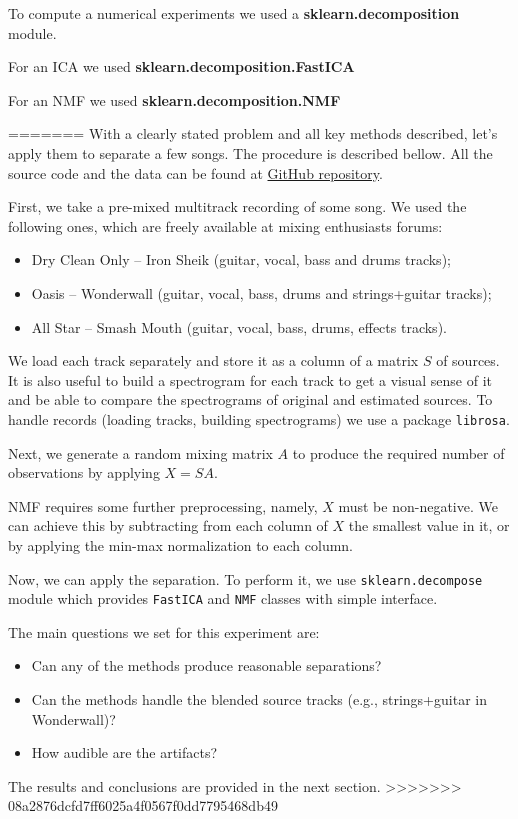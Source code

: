 \documentclass[../main.tex]{subfiles} %
\begin{document}
To compute a numerical experiments we used a \textbf{sklearn.decomposition} module.


For an ICA we used \textbf{sklearn.decomposition.FastICA}

For an NMF we used \textbf{sklearn.decomposition.NMF}








=======
With a clearly stated problem and all key methods described, let's apply them to separate a few songs. The procedure is described bellow. All the source code and the data can be found at \href{https://github.com/ikachko/LA-FinalProject}{GitHub repository}.

First, we take a pre-mixed multitrack recording of some song. We used the following ones, which are freely available at mixing enthusiasts forums:

\begin{itemize}[leftmargin=4em]
	\item Dry Clean Only -- Iron Sheik (guitar, vocal, bass and drums tracks);
	\item Oasis -- Wonderwall (guitar, vocal, bass, drums and strings+guitar tracks);
	\item All Star -- Smash Mouth (guitar, vocal, bass, drums, effects tracks).
\end{itemize}

We load each track separately and store it as a column of a matrix $S$ of sources.
It is also useful to build a spectrogram for each track to get a visual sense of it and be able to compare the spectrograms of original and estimated sources. 
To handle records (loading tracks, building spectrograms) we use a package \lstinline{librosa}.

Next, we generate a random mixing matrix $A$ to produce the required number of observations by applying $X = S A$.

NMF requires some further preprocessing, namely, $X$ must be non-negative.
We can achieve this by subtracting from each column of $X$ the smallest value in it, or by applying the min-max normalization to each column. 

Now, we can apply the separation. 
To perform it, we use \lstinline{sklearn.decompose} module which provides \lstinline{FastICA} and \lstinline{NMF} classes with simple interface.

The main questions we set for this experiment are:

\begin{itemize}[leftmargin=4em]
	\item Can any of the methods produce reasonable separations?
	\item Can the methods handle the blended source tracks (e.g., strings+guitar in Wonderwall)?
	\item How audible are the artifacts?
\end{itemize}

The results and conclusions are provided in the next section.
>>>>>>> 08a2876dcfd7ff6025a4f0567f0dd7795468db49
\end{document}
